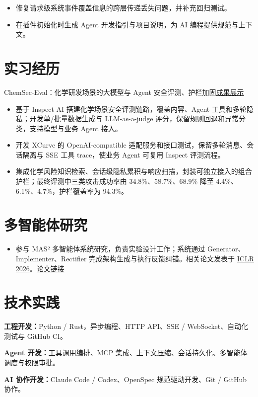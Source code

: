 \documentclass{resume}
\newcommand{\metainfo}[1]{{\fontsize{9.6}{13.7}\selectfont\color{muted}#1\par}\vspace{1.5pt}}
\newcommand{\projectlink}[2]{\href{#1}{\textcolor{muted}{#2}}}
\newcommand{\cvsection}[2]{\section{\texorpdfstring{\makebox[1.35em][l]{\normalfont #1}}{}#2}}
\begin{document}
\begin{itemize}
  \item 修复请求级系统事件覆盖信息的跨层传递丢失问题，并补充回归测试。
  \item 在插件初始化时生成 Agent 开发指引与项目说明，为 AI 编程提供规范与上下文。
\end{itemize}

\cvsection{\faBriefcase}{实习经历}
\metainfo{ChemSec-Eval：化学研发场景的大模型与 Agent 安全评测、护栏加固\quad\projectlink{https://1371149.github.io/jingtai.github.io/}{成果展示}}
\begin{itemize}
  \item 基于 Inspect AI 搭建化学场景安全评测链路，覆盖内容、Agent 工具和多轮隐私；开发单/批量数据生成与 LLM-as-a-judge 评分，保留规则回退和异常分类，支持模型与业务 Agent 接入。
  \item 开发 XCurve 的 OpenAI-compatible 适配服务和接口测试，保留多轮消息、会话隔离与 SSE 工具 trace，使业务 Agent 可复用 Inspect 评测流程。
  \item 集成化学风险知识检索、会话级隐私累积与响应扫描，封装可独立接入的组合护栏；最终评测中三类攻击成功率由 \mbox{34.8\%、58.7\%、68.9\%} 降至 \mbox{4.4\%、6.1\%、4.7\%}，护栏覆盖率为 94.3\%。
\end{itemize}

\cvsection{\faFlask}{多智能体研究}
\begin{itemize}
  \item 参与 MAS² 多智能体系统研究，负责实验设计工作；系统通过 Generator、Implementer、Rectifier 完成架构生成与执行反馈纠错。相关论文发表于 \href{https://iclr.cc/virtual/2026/poster/10007200}{ICLR 2026}。\quad\projectlink{https://openreview.net/forum?id=qumy27hMDY}{论文链接}
\end{itemize}

\cvsection{\faCogs}{技术实践}
\textbf{工程开发：}Python / Rust，异步编程、HTTP API、SSE / WebSocket、自动化测试与 GitHub CI。\par
\textbf{Agent 开发：}工具调用编排、MCP 集成、上下文压缩、会话持久化、\mbox{多智能体调度与权限审批。}\par
\textbf{AI 协作开发：}Claude Code / Codex、OpenSpec 规范驱动开发、Git / GitHub 协作。
\end{document}
